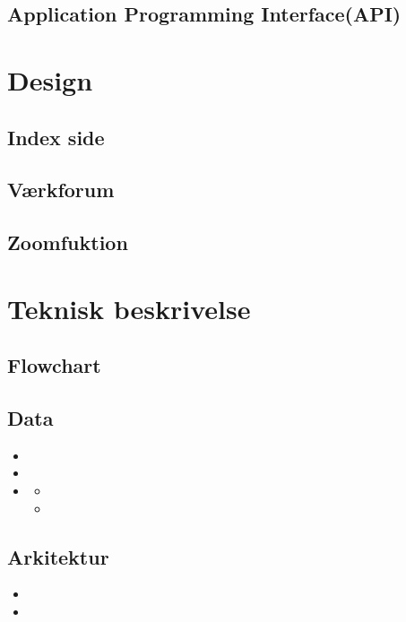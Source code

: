 \documentclass[final]{rapport1}
\begin{document}
\subsection{Application Programming Interface(API)}
\clearpage
\section{Design}

\subsection{Index side}

\subsection{Værkforum}



\subsection{Zoomfuktion}


\section{Teknisk beskrivelse}
\subsection{Flowchart}

\subsection{Data}
\begin{itemize}
\item 
\item
\item 
\begin{itemize}
\item 
\item 
\end{itemize}
\end{itemize}

\subsection{Arkitektur}
\begin{itemize}
\item 
\item 
\end{itemize}
\end{document}
